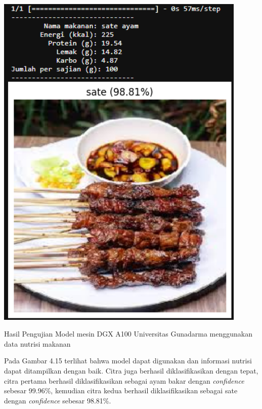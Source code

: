 \begin{afigure}
    \includegraphics[height=0.55\textheight, width=0.9\textwidth, center]{images/predict-2-dgx.png}
    \caption{Hasil Pengujian Model mesin DGX A100 Universitas Gunadarma menggunakan data nutrisi makanan}
    \label{fig:predict-2-dgx}
\end{afigure}

Pada Gambar 4.15 terlihat bahwa model dapat digunakan dan informasi nutrisi dapat ditampilkan dengan baik. Citra juga berhasil diklasifikasikan dengan tepat, citra pertama berhasil diklasifikasikan sebagai ayam bakar dengan \textit{confidence} sebesar 99.96\%, kemudian citra kedua berhasil diklasifikasikan sebagai sate dengan \textit{confidence} sebesar 98.81\%.



















